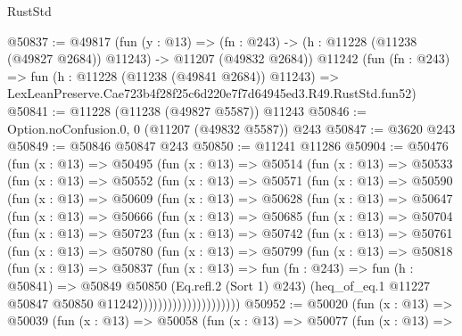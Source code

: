 \begin{lexlean}{RustStd}
\begin{coremodule}
@50837 := @49817
    (fun (y : @13) =>
    (fn : @243) -> (h : @11228 (@11238 (@49827 @2684)) @11243) -> @11207 (@49832 @2684))
    @11242
    (fun (fn : @243) =>
    fun (h : @11228 (@11238 (@49841 @2684)) @11243) =>
    LexLeanPreserve.Cae723b4f28f25c6d220e7f7d64945ed3.R49.RustStd.fun52)
@50841 := @11228 (@11238 (@49827 @5587)) @11243
@50846 := Option.noConfusion.{0, 0} (@11207 (@49832 @5587)) @243
@50847 := @3620 @243
@50849 := @50846 @50847 @243
@50850 := @11241 @11286
@50904 := @50476
    (fun (x : @13) =>
    @50495
      (fun (x : @13) =>
      @50514
        (fun (x : @13) =>
        @50533
          (fun (x : @13) =>
          @50552
            (fun (x : @13) =>
            @50571
              (fun (x : @13) =>
              @50590
                (fun (x : @13) =>
                @50609
                  (fun (x : @13) =>
                  @50628
                    (fun (x : @13) =>
                    @50647
                      (fun (x : @13) =>
                      @50666
                        (fun (x : @13) =>
                        @50685
                          (fun (x : @13) =>
                          @50704
                            (fun (x : @13) =>
                            @50723
                              (fun (x : @13) =>
                              @50742
                                (fun (x : @13) =>
                                @50761
                                  (fun (x : @13) =>
                                  @50780
                                    (fun (x : @13) =>
                                    @50799
                                      (fun (x : @13) =>
                                      @50818
                                        (fun (x : @13) =>
                                        @50837
                                          (fun (x : @13) =>
                                          fun (fn : @243) =>
                                          fun (h : @50841) =>
                                          @50849
                                            @50850
                                            (Eq.refl.{2} (Sort 1) @243)
                                            (heq_of_eq.{1}
                                              @11227
                                              @50847
                                              @50850
                                              @11242)))))))))))))))))))))
@50952 := @50020
    (fun (x : @13) =>
    @50039
      (fun (x : @13) =>
      @50058
        (fun (x : @13) =>
        @50077
          (fun (x : @13) =>

\end{coremodule}
\end{lexlean}
